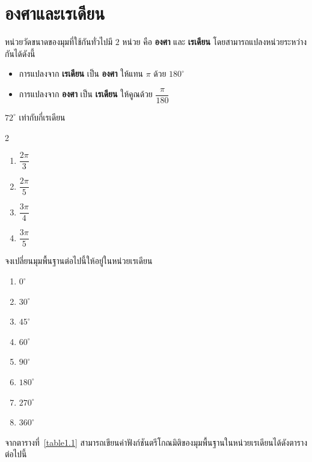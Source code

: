\newpage
\section{องศาและเรเดียน}
หน่วยวัดขนาดของมุมที่ใช้กันทั่วไปมี $2$ หน่วย คือ \textbf{องศา} และ \textbf{เรเดียน} 
โดยสามารถแปลงหน่วยระหว่างกันได้ดังนี้
\begin{conceptbox}
 \begin{itemize}
    \item[*] การแปลงจาก \textbf{เรเดียน} เป็น \textbf{องศา} ให้แทน $\pi$ ด้วย $180^\circ$
    \item[*] การแปลงจาก \textbf{องศา} เป็น \textbf{เรเดียน} ให้คูณด้วย $\dfrac{\pi}{180}$
\end{itemize}   
\end{conceptbox}

\begin{examplebox}  
$72^{\circ}$ เท่ากับกี่เรเดียน
\begin{multicols}{2}
\begin{enumerate}
\item $\dfrac{2\pi}{3}$
\item $\dfrac{2\pi}{5}$
\item $\dfrac{3\pi}{4}$
\item $\dfrac{3\pi}{5}$
\end{enumerate}
  \end{multicols}
\end{examplebox}

\begin{examplebox}
จงเปลี่ยนมุมพื้นฐานต่อไปนี้ให้อยู่ในหน่วยเรเดียน
\begin{enumerate}
\item $0^\circ$ 
\item $30^\circ$ 
\item $45^\circ$ 
\item $60^\circ$ 
\item $90^\circ$ 
\item $180^\circ$
\item $270^\circ$
\item $360^\circ$
\end{enumerate}
\end{examplebox}

จากตารางที่~\ref{table1.1} สามารถเขียนค่าฟังก์ชันตรีโกณมิติของมุมพื้นฐานในหน่วยเรเดียนได้ดังตารางต่อไปนี้

